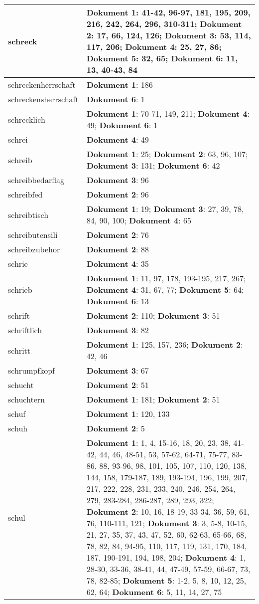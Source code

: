 \documentclass[a5paper]{article}
\begin{document}
\begin{longtable}[l]{|l|p{3in}|}
\hline
schreck & \textbf{Dokument 1}: 41-42, 96-97, 181, 195, 209, 216, 242, 264, 296, 310-311; \textbf{Dokument 2}: 17, 66, 124, 126; \textbf{Dokument 3}: 53, 114, 117, 206; \textbf{Dokument 4}: 25, 27, 86; \textbf{Dokument 5}: 32, 65; \textbf{Dokument 6}: 11, 13, 40-43, 84 \\
\hline
schreckenherrschaft & \textbf{Dokument 1}: 186 \\
\hline
schreckensherrschaft & \textbf{Dokument 6}: 1 \\
\hline
schrecklich & \textbf{Dokument 1}: 70-71, 149, 211; \textbf{Dokument 4}: 49; \textbf{Dokument 6}: 1 \\
\hline
schrei & \textbf{Dokument 4}: 49 \\
\hline
schreib & \textbf{Dokument 1}: 25; \textbf{Dokument 2}: 63, 96, 107; \textbf{Dokument 3}: 131; \textbf{Dokument 6}: 42 \\
\hline
schreibbedarflag & \textbf{Dokument 3}: 96 \\
\hline
schreibfed & \textbf{Dokument 2}: 96 \\
\hline
schreibtisch & \textbf{Dokument 1}: 19; \textbf{Dokument 3}: 27, 39, 78, 84, 90, 100; \textbf{Dokument 4}: 65 \\
\hline
schreibutensili & \textbf{Dokument 2}: 76 \\
\hline
schreibzubehor & \textbf{Dokument 2}: 88 \\
\hline
schrie & \textbf{Dokument 4}: 35 \\
\hline
schrieb & \textbf{Dokument 1}: 11, 97, 178, 193-195, 217, 267; \textbf{Dokument 4}: 31, 67, 77; \textbf{Dokument 5}: 64; \textbf{Dokument 6}: 13 \\
\hline
schrift & \textbf{Dokument 2}: 110; \textbf{Dokument 3}: 51 \\
\hline
schriftlich & \textbf{Dokument 3}: 82 \\
\hline
schritt & \textbf{Dokument 1}: 125, 157, 236; \textbf{Dokument 2}: 42, 46 \\
\hline
schrumpfkopf & \textbf{Dokument 3}: 67 \\
\hline
schucht & \textbf{Dokument 2}: 51 \\
\hline
schuchtern & \textbf{Dokument 1}: 181; \textbf{Dokument 2}: 51 \\
\hline
schuf & \textbf{Dokument 1}: 120, 133 \\
\hline
schuh & \textbf{Dokument 2}: 5 \\
\hline
schul & \textbf{Dokument 1}: 1, 4, 15-16, 18, 20, 23, 38, 41-42, 44, 46, 48-51, 53, 57-62, 64-71, 75-77, 83-86, 88, 93-96, 98, 101, 105, 107, 110, 120, 138, 144, 158, 179-187, 189, 193-194, 196, 199, 207, 217, 222, 228, 231, 233, 240, 246, 254, 264, 279, 283-284, 286-287, 289, 293, 322; \textbf{Dokument 2}: 10, 16, 18-19, 33-34, 36, 59, 61, 76, 110-111, 121; \textbf{Dokument 3}: 3, 5-8, 10-15, 21, 27, 35, 37, 43, 47, 52, 60, 62-63, 65-66, 68, 78, 82, 84, 94-95, 110, 117, 119, 131, 170, 184, 187, 190-191, 194, 198, 204; \textbf{Dokument 4}: 1, 28-30, 33-36, 38-41, 44, 47-49, 57-59, 66-67, 73, 78, 82-85; \textbf{Dokument 5}: 1-2, 5, 8, 10, 12, 25, 62, 64; \textbf{Dokument 6}: 5, 11, 14, 27, 75 \\

\end{longtable}
\end{document}
